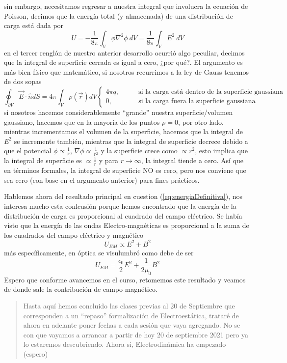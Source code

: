 \documentclass[11pt,a4paper]{article}
\begin{document}
sin embargo, necesitamos regresar a nuestra integral que involucra la ecuación de Poisson, decimos que la energía total (y almacenada) de una distribución de carga está dada por
\begin{equation}\label{eq:energiaDefinitiva}
U=-\frac{1}{8\pi}\int_V\phi\nabla^2\phi\ dV=\frac{1}{8\pi}\int_V E^2\ dV
\end{equation}
en el tercer renglón de nuestro anterior desarrollo ocurrió algo peculiar, decimos que la integral de superficie cerrada es igual a cero, ¿por qué?. El argumento es más bien físico que matemático, si nosotros recurrimos a la ley de Gauss tenemos de dos sopas
$$\oint_{\partial V}\vec{E}\cdot\hat{n}dS=4\pi\int_V\rho(\vec{r})dV\begin{cases}4\pi q,\qquad&\text{si la carga está dentro de la superficie gaussiana}\\
0,&\text{si la carga fuera la superficie gaussiana}\end{cases}$$
si nosotros hacemos considerablemente “grande'' nuestra superficie/volumen gaussiano, hacemos que en la mayoría de los puntos $\rho=0$, por otro lado, mientras incrementamos el volumen de la superficie, hacemos que la integral de $E^2$ se incremente también, mientras que la integral de superficie decrece debido a que el potencial $\phi\propto \frac{1}{r}$, $\nabla\phi\propto\frac{1}{r^2}$ y la superficie crece como $\propto r^2$, esto implica que la integral de superficie es $\propto\frac{1}{r}$ y para $r\to\infty$, la integral tiende a cero. Así que en términos formales, la integral de superficie NO es cero, pero nos conviene que sea cero (con base  en el argumento anterior) para fines prácticos.

Hablemos ahora del resultado principal en cuestion (\ref{eq:energiaDefinitiva}), nos interesa mucho esta conlcusión porque hemos encontrado que la energía de la distribución de carga es proporcional al cuadrado del campo eléctrico. Se había visto que la energía de las ondas Electro-magnéticas es proporcional a la suma de los cuadrados del campo eléctrico y magnético
$$U_{EM}\propto E^2+B^2$$
más específicamente, en óptica se visulumbró como debe de ser
$$U_{EM}=\frac{\epsilon_0}{2}E^2+\frac{1}{2\mu_0}B^2$$
Espero que conforme avancemos en el curso, retomemos este resultado y veamos de donde sale la contribución de campo magnético.

\begin{abstract}
Hasta aquí hemos concluido las clases previas al 20 de Septiembre que corresponden a un “repaso'' formalización de Electroestática, trataré de ahora en adelante poner fechas a cada sesión que vaya agregando. No se con que vayamos a arrancar a partir de hoy 20 de septiembre 2021 pero ya lo estaremos descubriendo. Ahora si, Electrodinámica ha empezado (espero)
\end{abstract}
\end{document}
